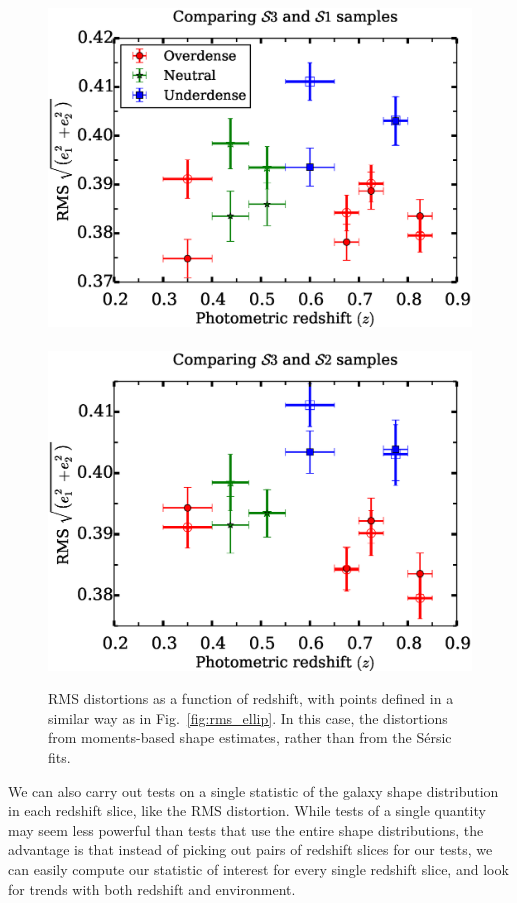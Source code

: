\documentclass[twocolumn,useAMS,usenatbib]{mn2e}
\newcommand{\sersic}{S\'{e}rsic }
\begin{document}
\begin{figure}
 \includegraphics[width=1.0\columnwidth]{rms_ellip_momentbased_noevolution.eps} \
 \includegraphics[width=1.0\columnwidth]{rms_ellip_momentbased_Bbandevolution.eps} \\
 \caption{RMS distortions as a function of redshift, with points
   defined in a similar way as in Fig.~\ref{fig:rms_ellip}.  In this
   case, the distortions from moments-based shape estimates, rather
   than from the \sersic fits. }
 \label{fig:rms_ellip_momentbased}         
\end{figure}

We can also carry out tests on a single statistic of the galaxy shape
distribution in each redshift slice, like the RMS distortion.  While
tests of a single quantity may seem less powerful than tests that use
the entire shape distributions, the advantage is that instead of
picking out pairs of redshift slices for our tests, we can easily compute our
statistic of interest for every single redshift slice, and look for
trends with both redshift and environment.
\end{document}
